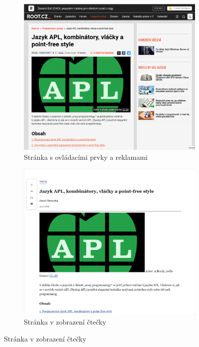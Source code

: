 \documentclass{csbulletin}
\newcommand\program[1]{#1}
\begin{document}
\begin{figure}[tbp]

  \centering
  \caption{Ukázka použití režimu \emph{zobrazení čtečky} v prohlížeči \program{Firefox}}
  \label{fig:readermode}

  \begin{subfigure}[t]{0.45\textwidth}
    \includegraphics[width=\textwidth]{img/root-balast.png}
    \caption{Stránka s ovládacími prvky a reklamami}
  \end{subfigure}
  \hfill
  \begin{subfigure}[t]{0.45\textwidth}
    \includegraphics[width=\textwidth]{img/root-čtečka.png}
    \caption{Stránka v zobrazení čtečky}
  \end{subfigure}
\end{figure}
\end{document}
